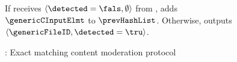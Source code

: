 \begin{figure}
{\begin{minipage}[t]{\textwidth}
%
%
%
%
%
 
\item If \client receives $\langle \detected = \fals, \emptyset \rangle$ from \server, \client adds $\genericCInputElmt$ to $\prevHashList$. Otherwise, \client outputs $\langle \genericFileID, \detected = \tru \rangle$. 

\protocolStepListEnd
 

\end{minipage}
} \caption{\protocolEM: Exact matching content moderation protocol \label{fig:exact_match}}
\end{figure}